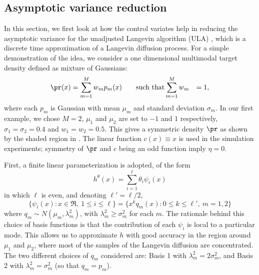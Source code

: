 \subsection{Asymptotic variance reduction}
\label{s:ex_avar}
In this section, we first look at how the control variates help in reducing the asymptotic variance for the unadjusted Langevin algorithm (ULA) \cite{andddefdoujor03}, which is a discrete time approximation of a Langevin diffusion process.  For a simple demonstration of the idea, we consider a one dimensional  multimodal target density defined as mixture of Gaussians:
\begin{equation}
\begin{aligned}
\pr(x)& = \sum_{m=1}^{M} w_{m} p_{m}(x) \qquad \text{such that}  \sum_{m=1}^{M} w_{m} &=1 ,
\label{e:gaussian_mix}
\end{aligned}
\end{equation}
where each $p_{m}$ is Gaussian with mean $\mu_{m}$ and standard deviation $\sigma_{m}$. In our first example, we chose $M=2$, $\mu_1$ and $\mu_2$ are set to $-1$ and $1$ respectively, $\sigma_1 = \sigma_2 = 0.4$ and $w_1 = w_2 = 0.5$. This gives a symmetric density $\pr$ as shown by the shaded region in . The linear function $c(x) \equiv x$ is used in the simulation experiments; symmetry of $\pr$ and $c$ being an odd function imply $\eta = 0$.

First, a finite linear parameterization is adopted, of the form
\[
h^\theta(x) =  \sum_{i=1}^\ell \theta_i \psi_i(x)
\]
in which $\ell$ is even, and denoting $\ell' = \ell/2$,
\begin{equation}
\{\psi_i(x) : x\in\Re,\ 1\le i\le \ell\}  = \{ x^k q_m(x) :  0\le k \le \ell',   \ m=1,2\}
\label{e:basis}
\end{equation}
where $q_m \sim N(\mu_m, \lambda^2_m)$,  with $\lambda^2_m \geq \sigma^2_m$ for each $m$.  The rationale behind this choice of basis functions is that the contribution of each $\psi_i$ is local to a particular mode.  This allows us to approximate $h$ with good accuracy in the region around $\mu_1$ and $\mu_2$, where most of the samples of the Langevin diffusion are concentrated. The two different choices of $q_m$ considered are:
Basis 1 with $\lambda^2_m = 2 \sigma^2_m$,  and Basis 2 with $\lambda^2_m = \sigma^2_m$  (so that $q_m=p_m$).


